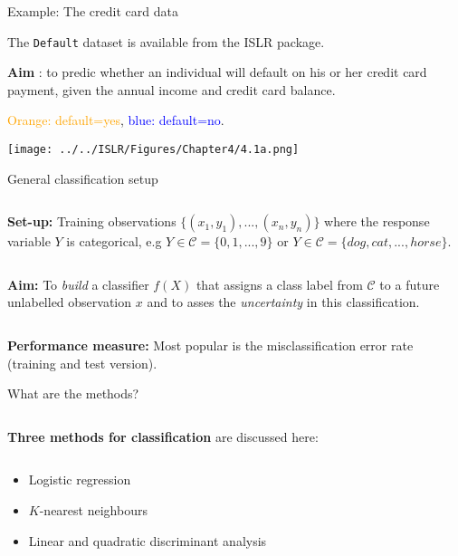 \documentclass[10pt,ignorenonframetext,]{beamer}
\begin{document}
\begin{frame}[fragile]

\begin{block}{Example: The credit card data}

\vspace{2mm}

The \texttt{Default} dataset is available from the ISLR package.

\vspace{2mm}

\textbf{Aim} : to predic whether an individual will default on his or
her credit card payment, given the annual income and credit card
balance.

\textcolor{orange}{Orange: default=yes},
\textcolor{blue}{blue: default=no}.

\centering
\texttt{[image: ../../ISLR/Figures/Chapter4/4.1a.png]}

\end{block}

\end{frame}

\begin{frame}

\begin{block}{General classification setup}

\(~\)

\textbf{Set-up:} Training observations
\(\{(x_1, y_1), ..., (x_n, y_n)\}\) where the response variable \(Y\) is
categorical, e.g \(Y \in \mathcal{C} = \{0, 1, ..., 9\}\) or
\(Y \in \mathcal{C} = \{dog, cat,... ,horse\}\).

\(~\)

\textbf{Aim: } To \emph{build} a classifier \(f(X)\) that assigns a
class label from \(\mathcal{C}\) to a future unlabelled observation
\(x\) and to asses the \emph{uncertainty} in this classification.

\(~\)

\textbf{Performance measure:} Most popular is the misclassification
error rate (training and test version).

\end{block}

\end{frame}

\begin{frame}

\begin{block}{What are the methods?}

\(~\)

\textbf{Three methods for classification} are discussed here:

\(~\)

\begin{itemize}
\item
  Logistic regression
\item
  \(K\)-nearest neighbours
\item
  Linear and quadratic discriminant analysis
\end{itemize}

\end{block}

\end{frame}
\end{document}
